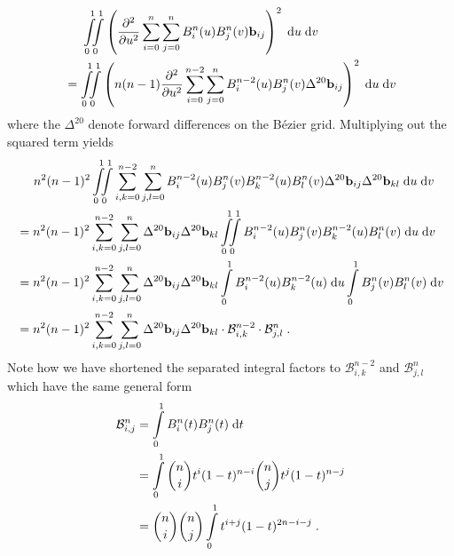 \begin{align*}
  &\phantom{={\ }} \bigint_0^1 \!\!\! \bigint_0^1 \left( \frac{\partial^2}{\partial u^2} \sum_{i=0}^n \sum_{j=0}^n B_i^n(u) B_j^n(v) \v{b}_{ij} \right)^2 \intd{u} \intd{v} \\
  &= \bigint_0^1 \!\!\! \bigint_0^1 \left( n (n-1) \frac{\partial^2}{\partial u^2} \sum_{i=0}^{n-2} \sum_{j=0}^n B_i^{n-2}(u) B_j^n(v) \Delta^{20} \v{b}_{ij} \right)^2 \intd{u} \intd{v}
\end{align*}
where the $\Delta^{20}$ denote forward differences on the B{\'e}zier grid.
Multiplying out the squared term yields
\begin{align*}
  &\phantom{={\ }} n^2 (n-1)^2 \bigint_0^1 \!\!\! \bigint_0^1 \sum_{i,k=0}^{n-2} \sum_{j,l=0}^n B_i^{n-2}(u) B_j^n(v) B_k^{n-2}(u) B_l^n(v) \Delta^{20} \v{b}_{ij} \Delta^{20} \v{b}_{kl} \intd{u} \intd{v} \\
  &= n^2 (n-1)^2 \sum_{i,k=0}^{n-2} \sum_{j,l=0}^n \Delta^{20} \v{b}_{ij} \Delta^{20} \v{b}_{kl} \bigint_0^1 \!\!\! \bigint_0^1 B_i^{n-2}(u) B_j^n(v) B_k^{n-2}(u) B_l^n(v) \intd{u} \intd{v} \\
  &= n^2 (n-1)^2 \sum_{i,k=0}^{n-2} \sum_{j,l=0}^n \Delta^{20} \v{b}_{ij} \Delta^{20} \v{b}_{kl} \bigint_0^1 B_i^{n-2}(u) B_k^{n-2}(u) \intd{u} \bigint_0^1 B_j^n(v)  B_l^n(v) \intd{v} \\
  &= n^2 (n-1)^2 \sum_{i,k=0}^{n-2} \sum_{j,l=0}^n \Delta^{20} \v{b}_{ij} \Delta^{20} \v{b}_{kl} \cdot \mathcal{B}_{i,k}^{n-2} \cdot \mathcal{B}_{j,l}^n
  \eqend .
\end{align*}
Note how we have shortened the separated integral factors to
$\mathcal{B}_{i,k}^{n-2}$ and $\mathcal{B}_{j,l}^n$ which have the same general
form
\begin{align}
  \mathcal{B}_{i,j}^n
  &= \int\displaylimits_0^1 B_i^n(t) B_j^n(t) \;\mathrm{d}{t} \; \nonumber \\
  &= \int\displaylimits_0^1 {n \choose i} t^i (1-t)^{n-i} {n \choose j} t^j (1-t)^{n-j} \nonumber \\
  &= {n \choose i} {n \choose j} \int\displaylimits_0^1 t^{i+j} (1-t)^{2n-i-j} \label{eq:tpe-hidden-beta}
  \; .
\end{align}
